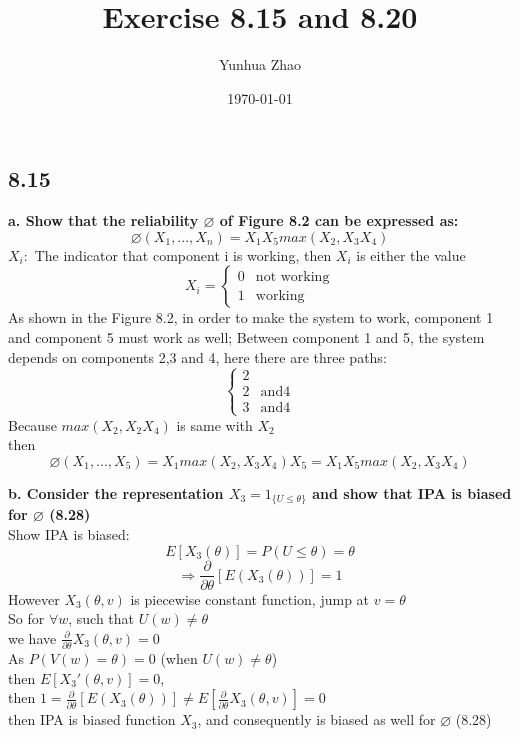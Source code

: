 \documentclass{article}
\title{Exercise 8.15 and 8.20}
\author{Yunhua Zhao}
\date{\today}
\begin{document}
\maketitle

\subsection{8.15}
\textbf{a. Show that the reliability $\varnothing$ of Figure 8.2 can be expressed as:}
$$ \varnothing(X_1,...,X_n) = X_1X_5max(X_2,X_3X_4) $$
$X_i:$ The indicator that component i is working, then $X_i$ is either the value 
$$ X_i = \left\{ \begin{array}{rcl} 0 & \mbox{not working} \\ 1 & \mbox{working} \end{array}\right. $$
As shown in the Figure 8.2, in order to make the system to work, component 1 and component 5 must work as well; Between component 1 and 5, the system depends on components 2,3 and 4, here there are three paths:
$$ \left\{ \begin{array}{rcl} 2 \\ 2 & \mbox{and} 4 \\ 3 & \mbox{and} 4 \end{array}\right. $$
Because $max(X_2,X_2X_4)$ is same with $X_2$  \\
then $$ \varnothing(X_1,...,X_5) = X_1max(X_2,X_3X_4)X_5 = X_1X_5max(X_2,X_3X_4) $$

\textbf{b. Consider the representation $X_3 = 1_{\{U\leq \theta\}}$ and show that IPA is biased for $\varnothing$ (8.28)} \\
Show IPA is biased: $$E[X_3(\theta)] = P(U\leq \theta) = \theta$$ 
$$\Rightarrow \frac{\partial}{\partial \theta}[E(X_3(\theta))] = 1 $$
However $X_3(\theta, v)$ is piecewise constant function, jump at $v = \theta$ \\
So for $\forall w$, such that $U(w)\neq \theta $ \\
we have $\frac{\partial}{\partial \theta}X_3(\theta,v) = 0$ \\
As $P(V(w)=\theta)=0$ (when $U(w)\neq \theta$)  \\
then $E[X_3'(\theta,v)]=0$, \\
then $1 = \frac{\partial}{\partial \theta}[E(X_3(\theta))] \neq E[\frac{\partial}{\partial \theta}X_3(\theta, v)] = 0$  \\
then IPA is biased function $X_3$, and consequently is biased as well for $\varnothing$ (8.28)
\end{document}
